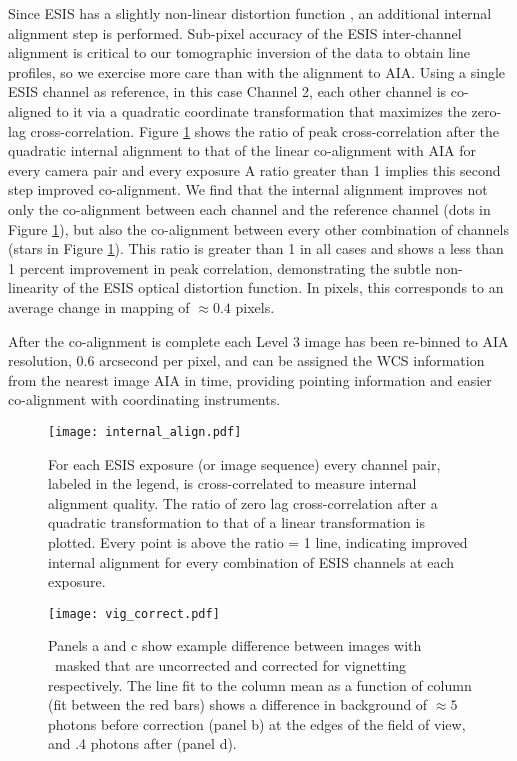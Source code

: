 Since ESIS has a slightly non-linear distortion function \citep{ESIS}, an additional internal alignment step is performed. 
Sub-pixel accuracy of the ESIS inter-channel alignment is critical to our tomographic inversion of the data to obtain line profiles, so we exercise more care than with the alignment to AIA.
Using a single ESIS channel as reference, in this case Channel 2, each other channel is co-aligned to it via a quadratic coordinate transformation that maximizes the zero-lag cross-correlation. 
Figure \ref{fig:cc} shows the ratio of peak cross-correlation after the quadratic internal alignment to that of the linear co-alignment with AIA for every camera pair and every exposure
A ratio greater than 1 implies this second step improved co-alignment.
We find that the internal alignment improves not only the co-alignment between each channel and the reference channel (dots in Figure \ref{fig:cc}), but also the co-alignment between every other combination of channels (stars in Figure \ref{fig:cc}).
This ratio is greater than 1 in all cases and shows a less than 1 percent improvement in peak correlation, demonstrating the subtle non-linearity of the ESIS optical distortion function.
In pixels, this corresponds to an average change in mapping of $\approx 0.4$ pixels.

After the co-alignment is complete each Level 3 image has been re-binned to AIA resolution, 0.6 arcsecond per pixel, and can be assigned the WCS information \citep{WCS} from the nearest image AIA in time, providing pointing information and easier co-alignment with coordinating instruments.



 \begin{figure}
	\centering
	\texttt{[image: internal\_align.pdf]}
	\caption{For each ESIS exposure (or image sequence) every channel pair, labeled in the legend, is cross-correlated to measure internal alignment quality.  The ratio of zero lag cross-correlation after a quadratic transformation to that of a linear transformation is plotted.  Every point is above the ratio = 1 line, indicating improved internal alignment for every combination of ESIS channels at each exposure.}
	\label{fig:cc}	
\end{figure}

 \begin{figure}
	\centering
	\texttt{[image: vig\_correct.pdf]}
	\caption{Panels a and c show example difference between images with \mgxbright \ masked that are uncorrected and corrected for vignetting respectively.  The line fit to the column mean as a function of column (fit between the red bars) shows a difference in background of $\approx 5$ photons before correction (panel b) at the edges of the field of view, and .4 photons after (panel d). }
	\label{fig:vig_correct}
\end{figure}

